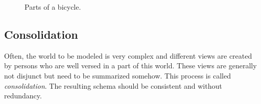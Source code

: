 \begin{figure}[htbp]
\begin{center}
\end{center}
\caption[Aggregation]{Parts of a bicycle.}
\end{figure}




\subsection{Consolidation}

Often, the world to be modeled is very complex and different views are created by persons who are well versed in a part of this world. These views are generally not disjunct but need to be summarized somehow. This process is called \emph{consolidation}. The resulting schema should be consistent and without redundancy.


